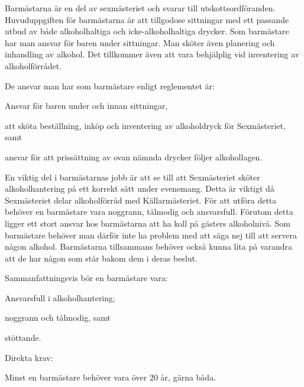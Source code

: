 \documentclass[10pt]{article}
\def\post{Barmästare}
\def\doctitle{Kravprofil för \post}
\begin{document}
\heading{\doctitle}

Barmästarna är en del av sexmästeriet och svarar till utskottsordföranden. Huvuduppgiften för barmästarna är att tillgodose sittningar med ett passande utbud av både alkoholhaltiga och icke-alkoholhaltiga drycker. Som barmästare har man ansvar för baren under sittningar. Man sköter även planering och inhandling av alkohol. Det tillkommer även att vara behjälplig vid inventering av alkoholförrådet. 

De ansvar man har som barmästare enligt reglementet är:
\begin{dashlist}
    \item Ansvar för baren under och innan sittningar, 
    \item att sköta beställning, inköp och inventering av alkoholdryck för Sexmästeriet, samt
    \item ansvar för att prissättning av ovan nämnda drycker följer alkohollagen.        
\end{dashlist}

En viktig del i barmästarnas jobb är att se till att Sexmästeriet sköter alkoholhantering på ett korrekt sätt under evenemang. Detta är viktigt då Sexmästeriet delar alkoholförråd med Källarmästeriet. För att utföra detta behöver en barmästare vara noggrann, tålmodig och ansvarsfull. Förutom detta ligger ett stort ansvar hos barmästarna att ha koll på gästers alkoholnivå. Som barmästare behöver man därför inte ha problem med att säga nej till att servera någon alkohol. Barmästarna tillsammans behöver också kunna lita på varandra att de har någon som står bakom dem i deras beslut.

Sammanfattningsvis bör en barmästare vara:
\begin{dashlist}
    \item Ansvarsfull i alkoholhantering,
    \item noggrann och tålmodig, samt
    \item stöttande.        
\end{dashlist}

Direkta krav:
\begin{dashlist}
    \item Minst en barmästare behöver vara över 20 år, gärna båda.     
\end{dashlist}
\end{document}
